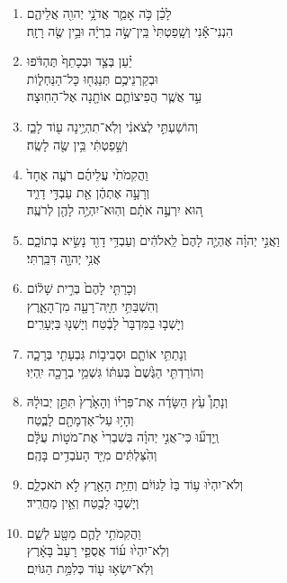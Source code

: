 \documentclass[12pt,a4paper,titlepage]{article}
\def \pscolor{red} %
\def \pslabelsep{0.8em} %
\def \psleftmargin{0em} %
\begin{document}
\begin{hebrew}
\begin{enumerate}[leftmargin=\psleftmargin, labelsep=\pslabelsep, label=\fontspec{Linux Libertine}\arabic*, font=\color{\pscolor}\small\textsuperscript, parsep=0em, itemsep=0em, topsep=0em]
      \item \texthebrew{לָכֵ֗ן כֹּ֥ה אָמַ֛ר אֲדֹנָ֥י יְהוִ֖ה אֲלֵיהֶ֑ם \\ הִנְנִי־אָ֕נִי וְשָֽׁפַטְתִּי֙ בֵּֽין־שֶׂ֣ה בִרְיָ֔ה וּבֵ֥ין שֶׂ֖ה רָזָֽה׃}
      \item \texthebrew{יַ֗עַן בְּצַ֤ד וּבְכָתֵף֙ תֶּהְדֹּ֔פוּ \\ וּבְקַרְנֵיכֶ֥ם תְּנַגְּח֖וּ כָּל־הַנַּחְל֑וֹת \\ עַ֣ד אֲשֶׁ֧ר הֲפִיצוֹתֶ֛ם אוֹתָ֖נָה אֶל־הַחֽוּצָה׃}
      \item \texthebrew{וְהוֹשַׁעְתִּ֣י לְצֹאנִ֔י וְלֹֽא־תִהְיֶ֥ינָה ע֖וֹד לָבַ֑ז \\ וְשָׁ֣פַטְתִּ֔י בֵּ֥ין שֶׂ֖ה לָשֶֽׂה׃}
      \item \texthebrew{וַהֲקִמֹתִ֙י עֲלֵיהֶ֜ם רֹעֶ֤ה אֶחָד֙ \\ וְרָעָ֣ה אֶתְהֶ֔ן אֵ֖ת עַבְדִּ֣י דָוִ֑יד \\ ה֚וּא יִרְעֶ֣ה אֹתָ֔ם וְהֽוּא־יִהְיֶ֥ה לָהֶ֖ן לְרֹעֶֽה׃}
      \item \texthebrew{וַאֲנִ֣י יְהוָ֗ה אֶהְיֶ֤ה לָהֶם֙ לֵֽאלֹהִ֔ים וְעַבְדִּ֥י דָוִ֖ד נָשִׂ֣יא בְתוֹכָ֑ם \\ אֲנִ֥י יְהוָ֖ה דִּבַּֽרְתִּי׃}
      \item \texthebrew{וְכָרַתִּ֤י לָהֶם֙ בְּרִ֣ית שָׁל֔וֹם \\ וְהִשְׁבַּתִּ֥י חַיָּֽה־רָעָ֖ה מִן־הָאָ֑רֶץ \\ וְיָשְׁב֤וּ בַמִּדְבָּר֙ לָבֶ֔טַח וְיָשְׁנ֖וּ בַּיְּעָרִֽים׃}
      \item \texthebrew{וְנָתַתִּ֥י אוֹתָ֛ם וּסְבִיב֥וֹת גִּבְעָתִ֖י בְּרָכָ֑ה \\ וְהוֹרַדְתִּ֤י הַגֶּ֙שֶׁם֙ בְּעִתּ֔וֹ גִּשְׁמֵ֥י בְרָכָ֖ה יִֽהְיֽוּ׃}
      \item \texthebrew{וְנָתַן֩ עֵ֙ץ הַשָּׂדֶ֜ה אֶת־פִּרְי֗וֹ וְהָאָ֙רֶץ֙ תִּתֵּ֣ן יְבוּלָ֔הּ \\ וְהָי֥וּ עַל־אַדְמָתָ֖ם לָבֶ֑טַח \\ וְֽיָדְע֞וּ כִּי־אֲנִ֣י יְהוָ֗ה בְּשִׁבְרִי֙ אֶת־מֹט֣וֹת עֻלָּ֔ם \\ וְהִ֙צַּלְתִּ֔ים מִיַּ֖ד הָעֹבְדִ֥ים בָּהֶֽם׃}
      \item \texthebrew{וְלֹא־יִהְי֙וּ ע֥וֹד בַּז֙ לַגּוֹיִ֔ם וְחַיַּ֥ת הָאָ֖רֶץ לֹ֣א תֹאכְלֵ֑ם \\ וְיָשְׁב֥וּ לָבֶ֖טַח וְאֵ֥ין מַחֲרִֽיד׃}
      \item \texthebrew{וַהֲקִמֹתִ֥י לָהֶ֛ם מַטָּ֖ע לְשֵׁ֑ם \\ וְלֹֽא־יִהְי֙וּ ע֜וֹד אֲסֻפֵ֤י רָעָב֙ בָּאָ֔רֶץ \\ וְלֹֽא־יִשְׂא֥וּ ע֖וֹד כְּלִמַּ֥ת הַגּוֹיִֽם׃}

\end{enumerate}
\end{hebrew}
\end{document}
